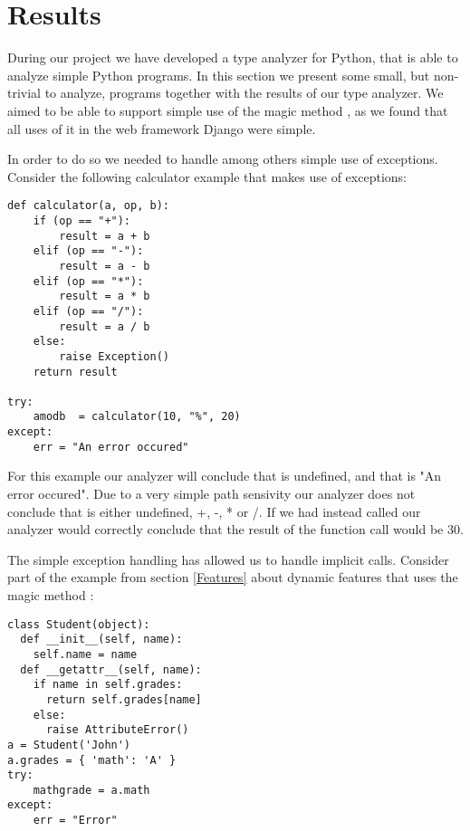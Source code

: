 \chapter{Results}
During our project we have developed a type analyzer for Python, that is able to analyze simple Python programs. In this section we present some small, but non-trivial to analyze, programs together with the results of our type analyzer. We aimed to be able to support simple use of the magic method , as we found that all uses of it in the web framework Django were simple.

In order to do so we needed to handle among others simple use of exceptions. Consider the following calculator example that makes use of exceptions:

\begin{listing}[H]
	\begin{verbatim}
def calculator(a, op, b):
	if (op == "+"):
		result = a + b
	elif (op == "-"):
		result = a - b
	elif (op == "*"):
		result = a * b
	elif (op == "/"):
		result = a / b
	else:
		raise Exception()
	return result

try:
	amodb  = calculator(10, "%", 20)
except:
	err = "An error occured"
	\end{verbatim}
\end{listing}

For this example our analyzer will conclude that  is undefined, and that  is "An error occured". Due to a very simple path sensivity our analyzer does not conclude that  is either undefined, +, -, * or /. If we had instead called  our analyzer would correctly conclude that the result of the function call would be 30.

The simple exception handling has allowed us to handle implicit  calls. Consider part of the  example from section \ref{Features} about dynamic features that uses the magic method :

\begin{listing}[H]
	\begin{verbatim}
class Student(object):
  def __init__(self, name):
    self.name = name
  def __getattr__(self, name):
    if name in self.grades:
      return self.grades[name]
    else:
      raise AttributeError()
a = Student('John')
a.grades = { 'math': 'A' }
try:
	mathgrade = a.math
except:
	err = "Error"
	\end{verbatim}
\end{listing}

